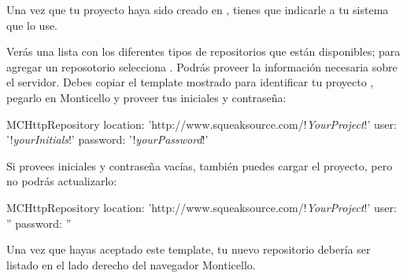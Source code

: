 \documentclass[a4paper,10pt,twoside]{book}
\begin{document}
Una vez que tu proyecto haya sido creado en \sqsrc, tienes que indicarle a tu sistema \pharo que lo use. 

Ver\'as una lista con los diferentes tipos de repositorios que est\'an disponibles; para agregar un reposotorio \sqsrc selecciona . Podr\'as proveer la informaci\'on necesaria sobre el servidor. 
Debes copiar el template mostrado para identificar tu proyecto \sqsrc, pegarlo en Monticello y proveer tus iniciales y contrase\~na:

\begin{code}{}
MCHttpRepository 
    location: 'http://www.squeaksource.com/!\emph{YourProject}!'
    user: '!\emph{yourInitials}!' 
    password: '!\emph{yourPassword}!'
\end{code}   

\noindent
Si provees iniciales y contrase\~na vac\'ias, tambi\'en puedes cargar el proyecto, pero no podr\'as actualizarlo:

\begin{code}{}
MCHttpRepository 
    location: 'http://www.squeaksource.com/!\emph{YourProject}!'
    user: '' 
    password: ''
\end{code}   

Una vez que hayas aceptado este template, tu nuevo repositorio deber\'ia ser listado en el lado derecho del navegador Monticello. 
\end{document}
